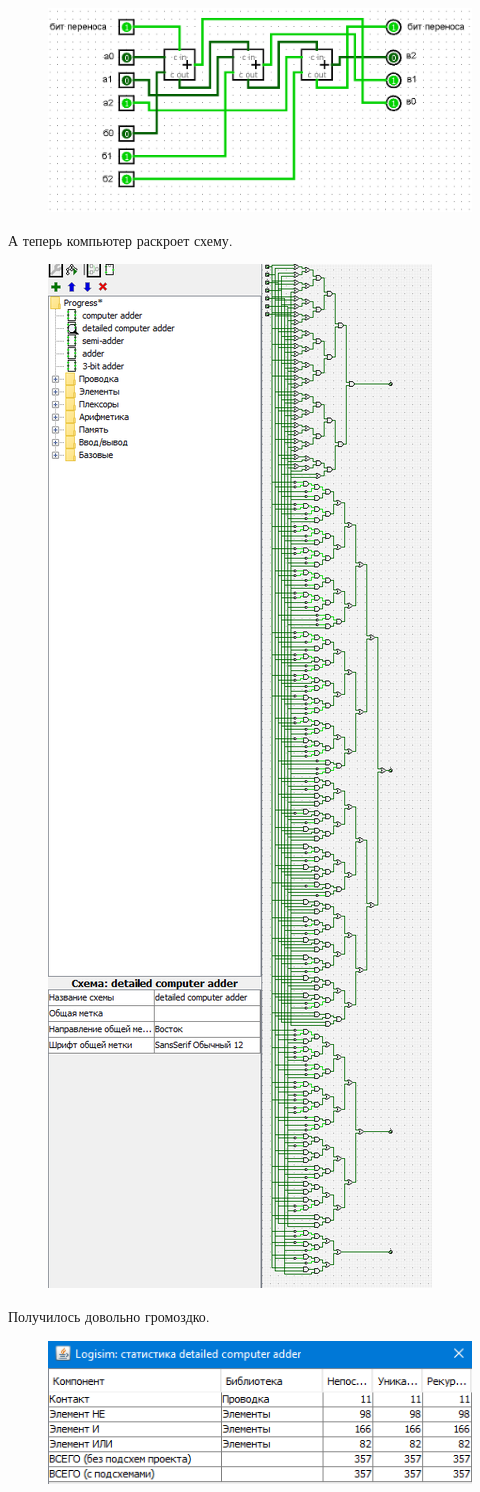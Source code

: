 \begin{figure}[H]
    \centering
    \includegraphics[width=0.75\linewidth]{Progress/computer adder.png}
\end{figure}
А теперь компьютер раскроет схему.
\begin{figure}[H]
    \centering
    \includegraphics[width=0.5\linewidth]{Progress/detailed computer adder.png}
\end{figure}
Получилось довольно громоздко.
\begin{figure}[H]
    \centering
    \includegraphics[width=0.5\linewidth]{Progress/detailed computer adder1.png}
\end{figure}
